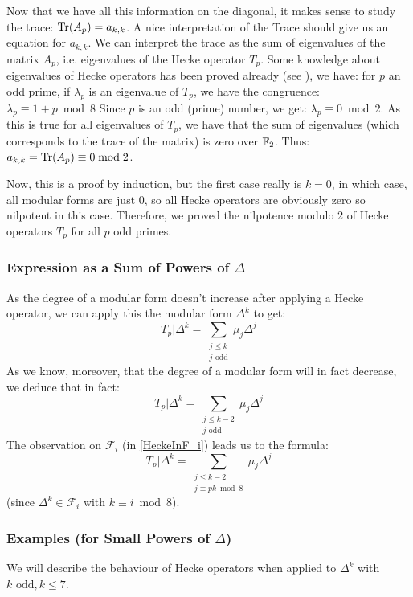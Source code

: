 Now that we have all this information on the diagonal, it makes sense to study the trace: 
$\text{Tr}(A_p) = a_{k,k}$.
A nice interpretation of the Trace should give us an equation for $a_{k,k}$.
We can interpret the trace as the sum of eigenvalues of the matrix $A_p$, i.e. eigenvalues of the Hecke operator $T_p$.
Some knowledge about eigenvalues of Hecke operators has been proved already (see \cite{EigenvaluesOfHeckeOperators}), we have:
for $p$ an odd prime, if $\lambda_p$ is an eigenvalue of $T_p$, we have the congruence: $\lambda_p \equiv 1+p \bmod 8$
Since $p$ is an odd (prime) number, we get: $\lambda_p \equiv 0 \bmod 2$.
As this is true for all eigenvalues of $T_p$, we have that the sum of eigenvalues (which corresponds to the trace of the matrix) is zero over $\mathbb{F}_2$.
Thus: 
$a_{k,k} = \text{Tr}(A_p) \equiv 0 \bmod 2$.

Now, this is a proof by induction, but the first case really is $k=0$, in which case, all modular forms are just $0$, so all Hecke operators are obviously zero so nilpotent in this case.
Therefore, we proved the nilpotence modulo 2 of Hecke operators $T_p$ for all $p$ odd primes.

\subsubsection[Expression for $T_p|\Delta^k$]{Expression as a Sum of Powers of $\Delta$}
As the degree of a modular form doesn't increase after applying a Hecke operator, we can apply this the modular form $\Delta^k$ to get:
$$
T_p|\Delta^k = \sum_{\substack{j \leq k \\ j \text{ odd}}} \mu_j\Delta^j
$$
As we know, moreover, that the degree of a modular form will in fact decrease, we deduce that in fact:
\[
T_p|\Delta^k = \sum_{\substack{j \leq k-2\\ j \text{ odd}}} \mu_j\Delta^j
\label{eq:TpDelta^k} \tag{*}
\]
The observation on $\mathcal{F}_i$ (in \ref{HeckeInF_i}) leads us to the formula:
\[
T_p|\Delta^k = \sum_{\substack{j \leq k-2\\ j \equiv pk \bmod 8}} \mu_j\Delta^j
\label{eq:TpDelta^k_bis} \tag{**}
\]
(since $\Delta^k \in \mathcal{F}_i \text{ with } k \equiv i \bmod 8$).

\subsubsection{Examples (for Small Powers of $\Delta$)}
We will describe the behaviour of Hecke operators when applied to $\Delta^k$ with $k \text{ odd}, k \leq 7$.

